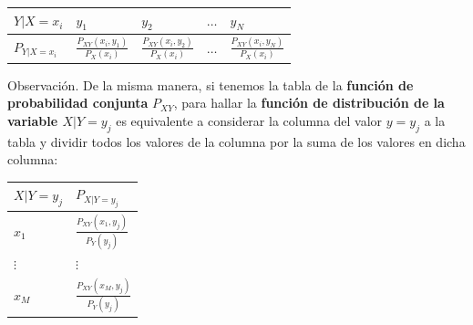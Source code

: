 \documentclass[]{book}
\begin{document}
\begin{longtable}[]{@{}lllll@{}}
\toprule
\begin{minipage}[b]{0.17\columnwidth}\raggedright
\(Y|X=x_i\)\strut
\end{minipage} & \begin{minipage}[b]{0.17\columnwidth}\raggedright
\(y_1\)\strut
\end{minipage} & \begin{minipage}[b]{0.17\columnwidth}\raggedright
\(y_2\)\strut
\end{minipage} & \begin{minipage}[b]{0.17\columnwidth}\raggedright
\(\ldots\)\strut
\end{minipage} & \begin{minipage}[b]{0.17\columnwidth}\raggedright
\(y_N\)\strut
\end{minipage}\tabularnewline
\midrule
\endhead
\begin{minipage}[t]{0.17\columnwidth}\raggedright
\(P_{Y|X=x_i}\)\strut
\end{minipage} & \begin{minipage}[t]{0.17\columnwidth}\raggedright
\(\frac{P_{XY}(x_i,y_1)}{P_X(x_i)}\)\strut
\end{minipage} & \begin{minipage}[t]{0.17\columnwidth}\raggedright
\(\frac{P_{XY}(x_i,y_2)}{P_X(x_i)}\)\strut
\end{minipage} & \begin{minipage}[t]{0.17\columnwidth}\raggedright
\(\ldots\)\strut
\end{minipage} & \begin{minipage}[t]{0.17\columnwidth}\raggedright
\(\frac{P_{XY}(x_i,y_N)}{P_X(x_i)}\)\strut
\end{minipage}\tabularnewline
\bottomrule
\end{longtable}

Observación.
De la misma manera, si tenemos la tabla de la \textbf{función de probabilidad conjunta} \(P_{XY}\), para hallar la \textbf{función de distribución de la variable \(X|Y=y_j\)} es equivalente a considerar la columna del valor \(y=y_j\) a la tabla y dividir todos los valores de la columna por la suma de los valores en dicha columna:

\begin{longtable}[]{@{}ll@{}}
\toprule
\(X|Y=y_j\) & \(P_{X|Y=y_j}\)\tabularnewline
\midrule
\endhead
\(x_1\) & \(\frac{P_{XY}(x_1,y_j)}{P_Y(y_j)}\)\tabularnewline
\(\vdots\) & \(\vdots\)\tabularnewline
\(x_M\) & \(\frac{P_{XY}(x_M,y_j)}{P_Y(y_j)}\)\tabularnewline
\bottomrule
\end{longtable}
\end{document}
